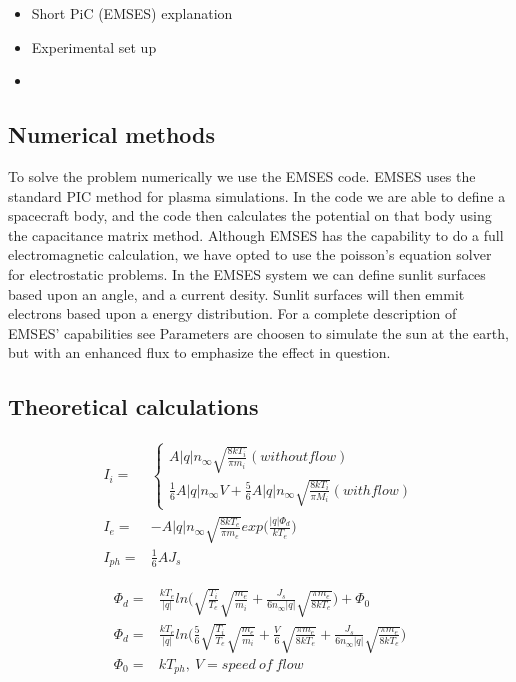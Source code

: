 \begin{itemize}
	\item Short PiC (EMSES) explanation
	\item Experimental set up
	\item 
\end{itemize}
\subsection{Numerical methods}

To solve the problem numerically we use the EMSES code. EMSES uses the standard PIC method for plasma simulations.
In the code we are able to define a spacecraft body, and the code then calculates the potential on that body using the capacitance matrix method.
Although EMSES has the capability to do a full electromagnetic calculation, we have opted to use the poisson's equation 
solver for electrostatic problems. In the EMSES system we can define sunlit surfaces based upon an angle, and a current 
desity. Sunlit surfaces will then emmit electrons based upon a energy distribution. For a complete description of EMSES' capabilities
see \citep{nakashima_ohhelp:_2009} Parameters are choosen to simulate the sun at the earth, but with an enhanced flux to emphasize the effect in question. 

\subsection{Theoretical calculations}

\begin{equation}
\begin{split}
 I_i = &
    \left\{\begin{array}{ccc}
       A|q|n_\infty\sqrt{\frac{8 k T_i}{\pi m_i}} (without flow)\\
       \frac{1}{6}A |q|n_\infty V + \frac{5}{6} A |q| n_\infty \sqrt{\frac{8 k T_i}{\pi M_i}}(with flow)
      \end{array}\right. \\
  I_e = & -A|q|n_\infty \sqrt{\frac{8 k T_e}{\pi m_e}}exp\Big(\frac{|q|\Phi_d}{k T_e}\Big)\\
  I_{ph} = & \frac{1}{6} AJ_s
\end{split}
\label{thin sheet potential} 
\end{equation}

\begin{equation}
\begin{split}
 \Phi_d = & \frac{k T_e}{|q|}ln\Big(\sqrt{\frac{T_i}{T_e}}\sqrt{\frac{m_e}{m_i}}+\frac{J_s}{6 n_\infty |q|}\sqrt{\frac{\pi m_e}{8 k T_e}}\Big) + \Phi_0 \\
 \Phi_d = & \frac{k T_e}{|q|}ln\Big(\frac{5}{6}\sqrt{\frac{T_i}{T_e}}\sqrt{\frac{m_e}{m_i}}+\frac{V}{6}\sqrt{\frac{\pi m_e}{8 k T_e}} + \frac{J_s}{6 n_\infty |q|}\sqrt{\frac{\pi m_e}{8 k T_e}} \Big) \\
 \Phi_0 = & k T_{ph}, \ V = speed\ of\ flow
\end{split}
\label{thin sheet potential 2} 
\end{equation}

